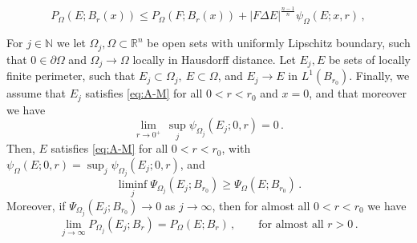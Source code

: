 \documentclass[10pt,a4paper]{amsart}
\newcommand{\N}{\mathbb{N}}
\newcommand{\R}{\mathbb{R}}
\newcommand{\de}{\partial}
\newcommand{\difsim}{\Delta}
\newcommand{\pr}{P_{\Omega}}
\newcommand{\p}{P}
\newcommand{\ra}{\rightarrow}
\begin{document}
\begin{equation}\label{eq:A-M}
\pr(E;B_{r}(x)) \leq \pr(F;B_{r}(x)) + |F \difsim E|^{\frac{n-1}{n}} \psi_{\Omega}(E;x,r) \, ,
\end{equation}

\begin{lemma}\label{lem:gaplsc}
For $j\in \N$ we let $\Omega_{j},\Omega\subset \R^{n}$ be open sets with uniformly Lipschitz boundary, such that $0\in \de\Omega$ and $\Omega_{j}\to \Omega$ locally in Hausdorff distance. Let $E_{j}, E$ be sets of locally finite perimeter, such that $E_{j}\subset \Omega_{j},\ E\subset \Omega$, and $E_{j}\to E$ in $L^{1}(B_{r_{0}})$. Finally, we assume that $E_{j}$ satisfies \eqref{eq:A-M} for all $0<r<r_{0}$ and $x=0$, and that moreover we have
\[
\lim_{r\to 0^{+}}\, \sup_{j} \psi_{\Omega_{j}}(E_{j};0,r) = 0\,.
\]
Then, $E$ satisfies \eqref{eq:A-M} for all $0<r<r_{0}$, with $\psi_{\Omega}(E;0,r) = \sup_{j} \psi_{\Omega_{j}}(E_{j};0,r)$, and 
\begin{equation}\label{LSCMinGap}
\liminf_{j} \Psi_{\Omega_{j}}(E_{j};B_{r_{0}}) \ge \Psi_{\Omega}(E;B_{r_{0}})\,.
\end{equation}
Moreover, if $\Psi_{\Omega_{j}}(E_{j};B_{r_{0}}) \to 0$ as $j\to\infty$, then for almost all $0<r<r_{0}$ we have
\begin{equation}\label{eq:perimcont}
\lim_{j \ra \infty} \p_{\Omega_{j}}(E_{j}; B_{r}) = \pr(E;B_{r}) \, , \qquad \text{for almost all $r > 0 \, .$}
\end{equation}
\end{lemma}
\end{document}
